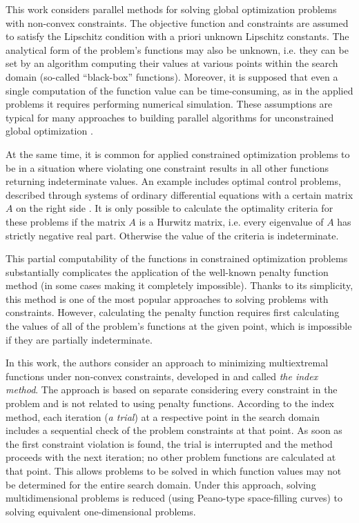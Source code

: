 \documentclass[smallextended]{svjour3}       %
\begin{document}
This work considers parallel methods for solving global optimization problems with non-convex constraints. The objective function and constraints are assumed to satisfy the Lipschitz condition with a priori unknown Lipschitz constants. The analytical form of the problem’s functions may also be unknown, i.e. they can be set by an algorithm computing their values at various points within the search domain (so-called ``black-box'' functions). Moreover, it is supposed that even a single computation of the function value can be time-consuming, as in the applied problems it requires performing numerical simulation. These assumptions are typical for many approaches to building parallel algorithms for unconstrained global optimization \cite{Jones2001,Paulavicius2011,Evtushenko2013}.

At the same time, it is common for applied constrained optimization problems to be in a situation where violating one constraint results in all other functions returning indeterminate values. An example includes optimal control problems, described through systems of ordinary differential equations with a certain matrix $A$ on the right side \cite{Balandin2011,Balandin2017}. It is only possible to calculate the optimality criteria for these problems if the matrix $A$ is a Hurwitz matrix, i.e. every eigenvalue of $A$ has strictly negative real part. Otherwise the value of the criteria is indeterminate.

This partial computability of the functions in constrained optimization problems substantially complicates the application of the well-known penalty function method (in some cases making it completely impossible). Thanks to its simplicity, this method is one of the most popular approaches to solving problems with constraints. However, calculating the penalty function requires first calculating the values of all of the problem’s functions at the given point, which is impossible if they are partially indeterminate.

In this work, the authors consider an approach to minimizing multiextremal functions under non-convex constraints, developed in \cite{Strongin2000,Sergeyev2001,Barkalov2002} and called \textit{the index method}. The approach is based on separate considering every constraint in the problem and is not related to using penalty functions. According to the index method, each iteration (\textit{a trial}) at a respective point in the search domain includes a sequential check of the problem constraints at that point. As soon as the first constraint violation is found, the trial is interrupted and the method proceeds with the next iteration; no other problem functions are calculated at that point. This allows problems to be solved in which function values may not be determined for the entire search domain. Under this approach, solving multidimensional problems is reduced (using Peano-type space-filling curves) to solving equivalent one-dimensional problems.
\end{document}
